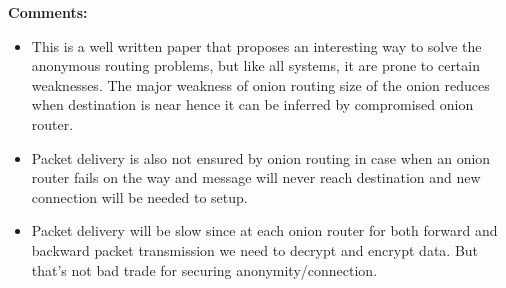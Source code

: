 \documentclass[a4paper,12pt, twoside]{article}
\begin{document}
\textbf{Comments:}
\begin{itemize}
	\item This is a well written paper that proposes an interesting way to solve the anonymous routing problems, but like all systems, it are prone to certain weaknesses. The major weakness of onion routing size of the onion reduces when destination is near hence it can be inferred by compromised onion router. 
	\item Packet delivery is also not ensured by onion routing in case when an onion router fails on the way and message will never reach destination and new connection will be needed to setup.
	\item Packet delivery will be slow since at each onion router for both forward and backward packet transmission we need to decrypt and encrypt data. But that's not bad trade for securing anonymity/connection.    
\end{itemize}
\end{document}
